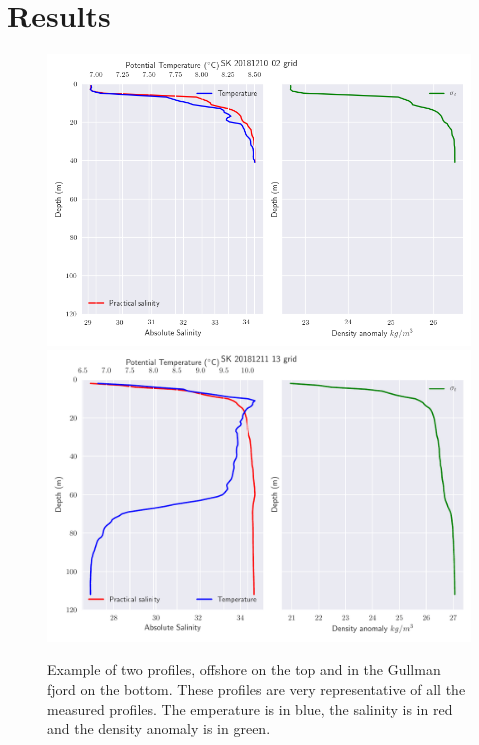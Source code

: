 \documentclass[12pt,a4paper]{article}
\begin{document}
\section{Results}

\begin{figure}
  \centering
  \includegraphics[width=\textwidth]{prof_offshore}
  \includegraphics[width=\textwidth]{prof_fjord}
  \caption{\label{fig:profex}Example of two profiles, offshore on the top and in
    the Gullman fjord on the bottom.
    These profiles are very representative of all the measured profiles.
    The emperature is in blue, the salinity is in red and the density anomaly
  is in green.}
  
\end{figure}
\end{document}
